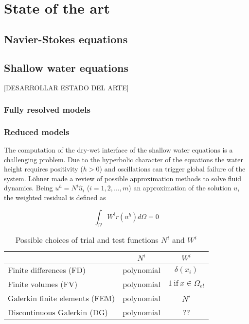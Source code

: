 
\chapter{State of the art}


\section{Navier-Stokes equations}


\section{Shallow water equations}



[DESARROLLAR ESTADO DEL ARTE]

\subsection{Fully resolved models}



\subsection{Reduced models}


The computation of the dry-wet interface of the shallow water equations is a challenging problem. Due to the hyperbolic character of the equations the water height requires positivity ($h>0$) and oscillations can trigger global failure of the system. Löhner \cite{lohner2008} made a review of possible approximation methods to solve fluid dynamics. Being $u^h = N^i\hat{u}_i$ ($i=1,2,\dots,m$) an approximation of the solution $u$, the weighted residual is defined as

\begin{equation}
\int_{\Omega} W^ir(u^h)d\Omega = 0
\end{equation}

\begin{table}
\centering
\begin{tabular}{|l|c|c|}
\hline
 & $N^i$ & $W^i$ \\ \hline
Finite differences (FD)         & polynomial & $\delta(x_i)$ \\ \hline
Finite volumes (FV)             & polynomial & $1 \ \text{if} \ x\in\Omega_{el}$ \\ \hline
Galerkin finite elements (FEM)  & polynomial & $N^i$ \\ \hline
Discontinuous Galerkin (DG)     & polynomial & ?? \\ \hline
\end{tabular}
\caption{Possible choices of trial and test functions $N^i$ and $W^i$}
\label{possible_trial_functions}
\end{table}

